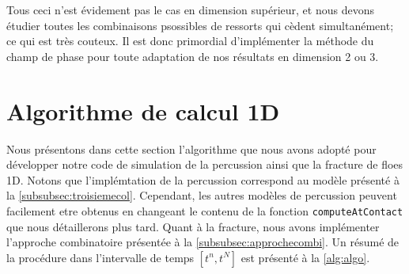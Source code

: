 Tous ceci n'est évidement pas le cas en dimension supérieur, et nous devons étudier toutes les combinaisons psossibles de ressorts qui cèdent simultanément; ce qui est très couteux. Il est donc primordial d'implémenter la méthode du champ de phase pour toute adaptation de nos résultats en dimension 2 ou 3.







\section{Algorithme de calcul 1D}


Nous présentons dans cette section l'algorithme que nous avons adopté pour développer notre code de simulation de la percussion ainsi que la fracture de floes 1D. Notons que l'implémtation de la percussion correspond au modèle présenté à la \cref{subsubsec:troisiemecol}. Cependant, les autres modèles de percussion peuvent facilement etre obtenus en changeant le contenu de la fonction \texttt{computeAtContact} que nous détaillerons plus tard. Quant à la fracture, nous avons implémenter l'approche combinatoire présentée à la \cref{subsubsec:approchecombi}. Un résumé de la procédure dans l'intervalle de temps $[t^n, t^{N}]$ est présenté à la \cref{alg:algo}.
